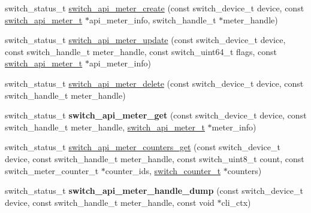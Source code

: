 \begin{DoxyCompactItemize}
\item 
switch\+\_\+status\+\_\+t \hyperlink{group__Meters_ga0d1c9a3d87406bc6a4313cee5367d56d}{switch\+\_\+api\+\_\+meter\+\_\+create} (const switch\+\_\+device\+\_\+t device, const \hyperlink{group__Meters_ga39b6cf8a3c569d2feee8e369fbc90bb4}{switch\+\_\+api\+\_\+meter\+\_\+t} $\ast$api\+\_\+meter\+\_\+info, switch\+\_\+handle\+\_\+t $\ast$meter\+\_\+handle)
\item 
switch\+\_\+status\+\_\+t \hyperlink{group__Meters_ga9a0e1660a9b1ce5c73382366e59142d5}{switch\+\_\+api\+\_\+meter\+\_\+update} (const switch\+\_\+device\+\_\+t device, const switch\+\_\+handle\+\_\+t meter\+\_\+handle, const switch\+\_\+uint64\+\_\+t flags, const \hyperlink{group__Meters_ga39b6cf8a3c569d2feee8e369fbc90bb4}{switch\+\_\+api\+\_\+meter\+\_\+t} $\ast$api\+\_\+meter\+\_\+info)
\item 
switch\+\_\+status\+\_\+t \hyperlink{group__Meters_ga3c2af22adbe7c28abcca024d7c9ab844}{switch\+\_\+api\+\_\+meter\+\_\+delete} (const switch\+\_\+device\+\_\+t device, const switch\+\_\+handle\+\_\+t meter\+\_\+handle)
\item 
\hypertarget{group__Meters_gaeed5a04f870b72f6226db96690effcd8}{switch\+\_\+status\+\_\+t {\bfseries switch\+\_\+api\+\_\+meter\+\_\+get} (const switch\+\_\+device\+\_\+t device, const switch\+\_\+handle\+\_\+t meter\+\_\+handle, \hyperlink{group__Meters_ga39b6cf8a3c569d2feee8e369fbc90bb4}{switch\+\_\+api\+\_\+meter\+\_\+t} $\ast$meter\+\_\+info)}\label{group__Meters_gaeed5a04f870b72f6226db96690effcd8}

\item 
switch\+\_\+status\+\_\+t \hyperlink{group__Meters_gac46444f363690e77df60b93f9d1bfff4}{switch\+\_\+api\+\_\+meter\+\_\+counters\+\_\+get} (const switch\+\_\+device\+\_\+t device, const switch\+\_\+handle\+\_\+t meter\+\_\+handle, const switch\+\_\+uint8\+\_\+t count, const switch\+\_\+meter\+\_\+counter\+\_\+t $\ast$counter\+\_\+ids, \hyperlink{structswitch__counter__s}{switch\+\_\+counter\+\_\+t} $\ast$counters)
\item 
\hypertarget{group__Meters_gaa13e2dc2b567f109a121f2715894352f}{switch\+\_\+status\+\_\+t {\bfseries switch\+\_\+api\+\_\+meter\+\_\+handle\+\_\+dump} (const switch\+\_\+device\+\_\+t device, const switch\+\_\+handle\+\_\+t meter\+\_\+handle, const void $\ast$cli\+\_\+ctx)}\label{group__Meters_gaa13e2dc2b567f109a121f2715894352f}

\end{DoxyCompactItemize}


